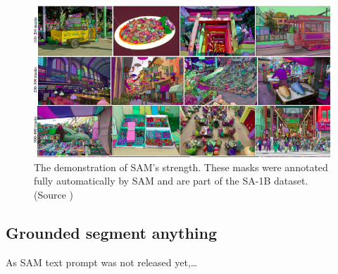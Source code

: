 \begin{figure}[h]
  \centering
  \includegraphics[width=\linewidth]{text/chapter_03/imgs/sam_example}
  \caption{The demonstration of SAM's strength. These masks were annotated fully automatically by SAM and are part of
  the SA-1B dataset. (Source \cite{SAM2023})}
  \label{fig:sam_example}
\end{figure}

\subsection{Grounded segment anything}
As SAM text prompt was not released yet,\ldots
{}
